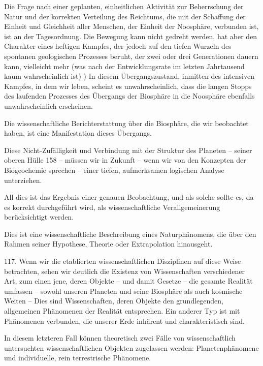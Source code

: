 \documentclass[11pt,a4paper]{book}
\begin{document}
Die Frage nach einer geplanten, einheitlichen Aktivität zur Beherrschung der Natur und der korrekten Verteilung des Reichtums, die mit der Schaffung der Einheit und Gleichheit aller Menschen, der Einheit der Noosphäre, verbunden ist, ist an der Tagesordnung. Die Bewegung kann nicht gedreht werden, hat aber den Charakter eines heftigen Kampfes, der jedoch auf den tiefen Wurzeln des spontanen geologischen Prozesses beruht, der zwei oder drei Generationen dauern kann, vielleicht mehr (was nach der Entwicklungsrate im letzten Jahrtausend kaum wahrscheinlich ist) ) In diesem Übergangszustand, inmitten des intensiven Kampfes, in dem wir leben, scheint es unwahrscheinlich, dass die langen Stopps des laufenden Prozesses des Übergangs der Biosphäre in die Noosphäre ebenfalls unwahrscheinlich erscheinen.



Die wissenschaftliche Berichterstattung über die Biosphäre, die wir beobachtet haben, ist eine Manifestation dieses Übergangs.



Diese Nicht-Zufälligkeit und Verbindung mit der Struktur des Planeten -- seiner oberen Hülle 158 -- müssen wir in Zukunft -- wenn wir von den Konzepten der Biogeochemie sprechen -- einer tiefen, aufmerksamen logischen Analyse unterziehen.



All dies ist das Ergebnis einer genauen Beobachtung, und als solche sollte es, da es korrekt durchgeführt wird, als wissenschaftliche Verallgemeinerung berücksichtigt werden.



Dies ist eine wissenschaftliche Beschreibung eines Naturphänomens, die über den Rahmen seiner Hypothese, Theorie oder Extrapolation hinausgeht.



117. Wenn wir die etablierten wissenschaftlichen Disziplinen auf diese Weise betrachten, sehen wir deutlich die Existenz von Wissenschaften verschiedener Art, zum einen jene, deren Objekte -- und damit Gesetze -- die gesamte Realität umfassen -- sowohl unseren Planeten und seine Biosphäre als auch kosmische Weiten -- Dies sind Wissenschaften, deren Objekte den grundlegenden, allgemeinen Phänomenen der Realität entsprechen. Ein anderer Typ ist mit Phänomenen verbunden, die unserer Erde inhärent und charakteristisch sind.



In diesem letzteren Fall können theoretisch zwei Fälle von wissenschaftlich untersuchten wissenschaftlichen Objekten zugelassen werden: Planetenphänomene und individuelle, rein terrestrische Phänomene.
\end{document}
